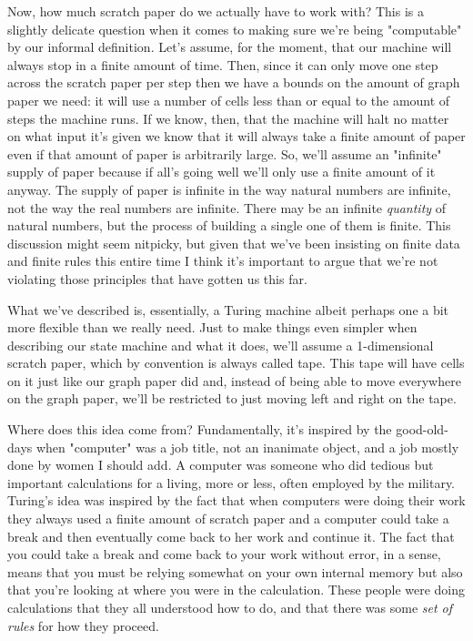 \documentclass[11pt]{article}
\begin{document}
Now, how much scratch paper do we actually have to work with? This is a slightly delicate question when it comes to making sure we're being "computable" by our informal definition. Let's assume, for the moment, that our machine will always stop in a finite amount of time. Then, since it can only move one step across the scratch paper per step then we have a bounds on the amount of graph paper we need: it will use a number of cells less than or equal to the amount of steps the machine runs. If we know, then, that the machine will halt no matter on what input it's given we know that it will always take a finite amount of paper even if that amount of paper is arbitrarily large. So, we'll assume an "infinite" supply of paper because if all's going well we'll only use a finite amount of it anyway. The supply of paper is infinite in the way natural numbers are infinite, not the way the real numbers are infinite. There may be an infinite \emph{quantity} of natural numbers, but the process of building a single one of them is finite. This discussion might seem nitpicky, but given that we've been insisting on finite data and finite rules this entire time I think it's important to argue that we're not violating those principles that have gotten us this far. 

What we've described is, essentially, a Turing machine albeit perhaps one a bit more flexible than we really need.  Just to make things even simpler when describing our state machine and what it does, we'll assume a 1-dimensional scratch paper, which by convention is always called tape. This tape will have cells on it just like our graph paper did and, instead of being able to move everywhere on the graph paper, we'll be restricted to just moving left and right on the tape.

Where does this idea come from? Fundamentally, it's inspired by the good-old-days when "computer" was a job title, not an inanimate object, and a job mostly done by women I should add. A computer was someone who did tedious but important calculations for a living, more or less, often employed by the military. Turing's idea was inspired by the fact that when computers were doing their work they always used a finite amount of scratch paper and a computer could take a break and then eventually come back to her work and continue it. The fact that you could take a break and come back to your work without error, in a sense, means that you must be relying somewhat on your own internal memory but also that you're looking at where you were in the calculation. These people were doing calculations that they all understood how to do, and that there was some \emph{set of rules} for how they proceed. 
\end{document}
